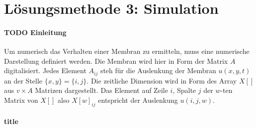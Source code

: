 %
%
%
\section{Lösungsmethode 3: Simulation 
	\label{kreismembran:section:teil4}}
\paragraph{TODO Einleitung}

Um numerisch das Verhalten einer Membran zu ermitteln, muss eine numerische Darstellung definiert werden.
Die Membran wird hier in Form der Matrix $  A $ digitalisiert.
Jedes Element  $ A_{ij} $ steh für die Auslenkung der Membran $ u(x,y,t) $ an der Stelle $ \{x,y\}=\{i,j\} $.
Die zeitliche Dimension wird in Form des Array $  X[] $ aus $ v \times A $ Matrizen dargestellt.
Das Element auf Zeile $ i $, Spalte $ j $ der $ w $-ten Matrix von $ X[] $ also $ X[w]_{ij} $ entspricht der Auslenkung $ u(i,j,w) $.

\paragraph{title}